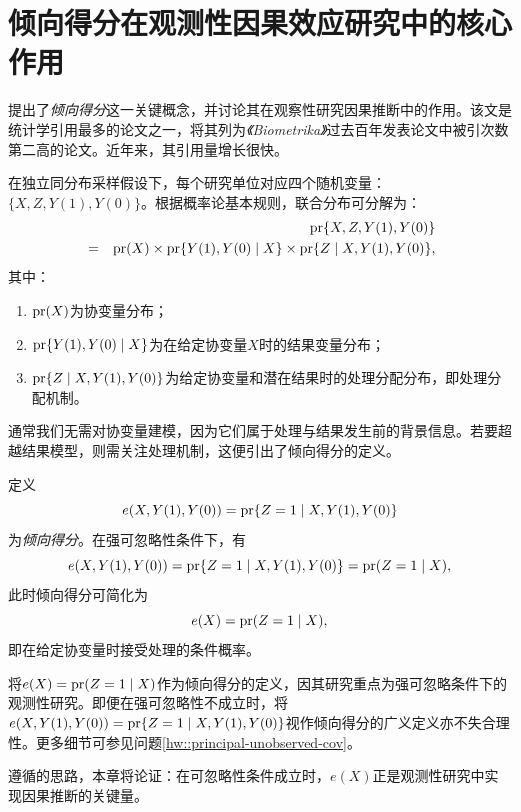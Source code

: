 
\chapter{倾向得分在观测性因果效应研究中的核心作用}\label{chapter::pscore-key}
 
 
\citet{rosenbaum1983central}提出了{\it 倾向得分}这一关键概念，并讨论其在观察性研究因果推断中的作用。该文是统计学引用最多的论文之一，\citet{titterington2013biometrika}将其列为{\it《Biometrika》}过去百年发表论文中被引次数第二高的论文。近年来，其引用量增长很快。 


在独立同分布采样假设下，每个研究单位对应四个随机变量：$\{  X, Z, Y(1), Y(0) \} $。根据概率论基本规则，联合分布可分解为：
\begin{eqnarray*}
&&\textup{pr} \{  X, Z, Y(1), Y(0) \}  \\
 &=& \textup{pr}(X)  
\times   \textup{pr}\{ Y(1), Y(0) \mid X \}   
 \times  \textup{pr}\{  Z\mid X, Y(1), Y(0)  \} ,
\end{eqnarray*}
其中：
\begin{enumerate}
\item
 $\textup{pr}(X)$为协变量分布； 
 \item
 $\textup{pr}\{ Y(1), Y(0) \mid X \}$为在给定协变量$X$时的结果变量分布；
 \item
 $\textup{pr}\{  Z\mid X, Y(1), Y(0)  \}$为给定协变量和潜在结果时的处理分配分布，即处理分配机制。
\end{enumerate}
通常我们无需对协变量建模，因为它们属于处理与结果发生前的背景信息。若要超越结果模型，则需关注处理机制，这便引出了倾向得分的定义。

\begin{definition}
[倾向得分]\label{def::pscore}
定义
$$
e(X, Y(1), Y(0)   ) = \textup{pr}\{  Z=1\mid X, Y(1), Y(0)  \}
$$
为{\it 倾向得分}。在强可忽略性条件下，有
$$
 e(X, Y(1), Y(0)   )  = \textup{pr}\{  Z=1\mid X, Y(1), Y(0)  \} = \textup{pr}(Z=1 \mid X),
$$
此时倾向得分可简化为
$$
e(X) = \textup{pr}(Z=1 \mid X),
$$
即在给定协变量时接受处理的条件概率。  
\end{definition} 

 
\citet{rosenbaum1983central}将$e(X) = \textup{pr}(Z=1 \mid X)$作为倾向得分的定义，因其研究重点为强可忽略条件下的观测性研究。即便在强可忽略性不成立时，将$e(X, Y(1), Y(0)   ) = \textup{pr}\{  Z=1\mid X, Y(1), Y(0)  \}$视作倾向得分的广义定义亦不失合理性。更多细节可参见问题\ref{hw::principal-unobserved-cov}。 

遵循\citet{rosenbaum1983central}的思路，本章将论证：在可忽略性条件成立时，$e(X)$正是观测性研究中实现因果推断的关键量。

 


